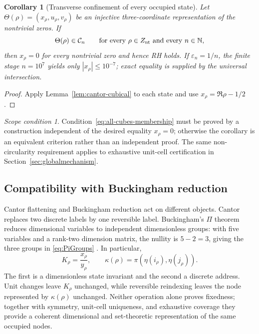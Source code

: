 \documentclass[11pt]{amsart}
\newtheorem{corollary}[theorem]{Corollary}
\theoremstyle{definition}
\theoremstyle{remark}
\newtheorem{scope}[theorem]{Scope condition}
\begin{document}
\begin{corollary}[Transverse confinement of every occupied state]
\label{cor:cubical-transverse-confinement}
Let $\Theta(\rho)=(x_\rho,u_\rho,v_\rho)$ be an injective three-coordinate representation of
the nontrivial zeros.  If
\begin{equation}\label{eq:all-cubes-membership}
 \Theta(\rho)\in\mathcal C_n
 \qquad\text{for every }\rho\in Z_{\rm nt}\text{ and every }n\in\mathbb N,
\end{equation}
then $x_\rho=0$ for every nontrivial zero and hence RH holds.  If
$\varepsilon_n=1/n$, the finite stage $n=10^7$ yields only
$|x_\rho|\le10^{-7}$; exact equality is supplied by the universal intersection.
\end{corollary}

\begin{proof}
Apply Lemma~\ref{lem:cantor-cubical} to each state and use
$x_\rho=\Re\rho-1/2$.
\end{proof}

\begin{scope}
Condition~\eqref{eq:all-cubes-membership} must be proved by a construction independent of
the desired equality $x_\rho=0$; otherwise the corollary is an equivalent criterion rather
than an independent proof.  The same non-circularity requirement applies to exhaustive
unit-cell certification in Section~\ref{sec:globalmechanism}.
\end{scope}

\subsection{Compatibility with Buckingham reduction}
Cantor flattening and Buckingham reduction act on different objects.  Cantor replaces two
discrete labels by one reversible label.  Buckingham's $\Pi$ theorem reduces dimensional
variables to independent dimensionless groups: with five variables and a rank-two dimension
matrix, the nullity is $5-2=3$, giving the three groups in \eqref{eq:PiGroups}
\cite{Buckingham1914}.  In particular,
\begin{equation}\label{eq:K-cantor-parallel}
 K_\rho=\frac{x_\rho}{y_\rho},
 \qquad
 \kappa(\rho)=\pi\!\left(\eta(i_\rho),\eta(j_\rho)\right).
\end{equation}
The first is a dimensionless state invariant and the second a discrete address.  Unit changes
leave $K_\rho$ unchanged, while reversible reindexing leaves the node represented by
$\kappa(\rho)$ unchanged.  Neither operation alone proves fixedness; together with
symmetry, unit-cell uniqueness, and exhaustive coverage they provide a coherent dimensional
and set-theoretic representation of the same occupied nodes.
\end{document}

